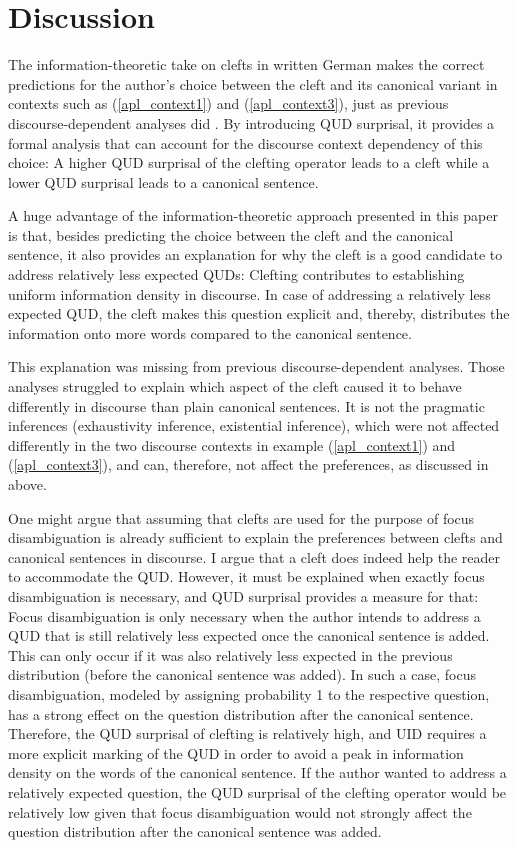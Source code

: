 \documentclass[output=paper,colorlinks,citecolor=brown]{langscibook}
\begin{document}
\section{Discussion}\label{sec:6_discussion}
The information-theoretic take on clefts in written German makes the correct predictions for the author's choice between the cleft and its canonical variant in contexts such as (\ref{apl_context1}) and (\ref{apl_context3}), just as previous discourse-dependent analyses did \citep[e.g.,][]{destruel_velleman_2014,tonnis_2021}. By introducing QUD surprisal, it provides a formal analysis that can account for the discourse context dependency of this choice: A higher QUD surprisal of the clefting operator leads to a cleft while a lower QUD surprisal leads to a canonical sentence.  

A huge advantage of the information-theoretic approach presented in this paper is that, besides predicting the choice between the cleft and the canonical sentence, it also provides an explanation for why the cleft is a good candidate to address relatively less expected QUDs: Clefting contributes to establishing uniform information density in discourse. In case of addressing a relatively less expected QUD, the cleft makes this question explicit and, thereby, distributes the information onto more words compared to the canonical sentence.

This explanation was missing from previous discourse-dependent analyses. Those analyses struggled to explain which aspect of the cleft caused it to behave differently in discourse than plain canonical sentences. It is not the pragmatic inferences (exhaustivity inference, existential inference), which were not affected differently in the two discourse contexts in example (\ref{apl_context1}) and (\ref{apl_context3}), and can, therefore, not affect the preferences, as discussed in  above.

One might argue that assuming that clefts are used for the purpose of focus disambiguation is already sufficient to explain the preferences between clefts and canonical sentences in discourse. I argue that a cleft does indeed help the reader to accommodate the QUD. However, it must be explained when exactly focus disambiguation is necessary, and QUD surprisal provides a measure for that: Focus disambiguation is only necessary when the author intends to address a QUD that is still relatively less expected once the canonical sentence is added. This can only occur if it was also relatively less expected in the previous distribution (before the canonical sentence was added). In such a case, focus disambiguation, modeled by assigning probability 1 to the respective question, has a strong effect on the question distribution after the canonical sentence. Therefore, the QUD surprisal of clefting is relatively high, and UID requires a more explicit marking of the QUD in order to avoid a peak in information density on the words of the canonical sentence. If the author wanted to address a relatively expected question, the QUD surprisal of the clefting operator would be relatively low given that focus disambiguation would not strongly affect the question distribution after the canonical sentence was added.
\end{document}
